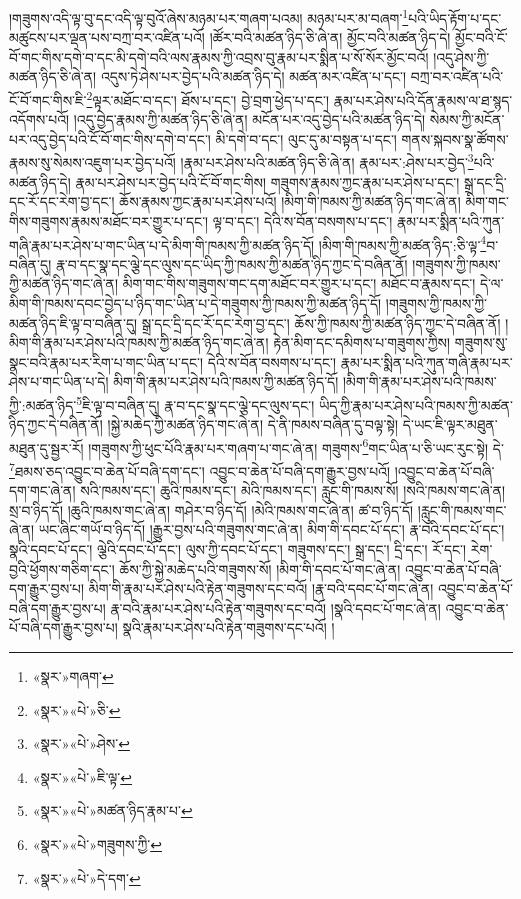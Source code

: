 །གཟུགས་འདི་ལྟ་བུ་དང་འདི་ལྟ་བུའོ་ཞེས་མཉམ་པར་གཞག་པའམ། མཉམ་པར་མ་བཞག་\footnote{«སྣར་»གཞག་}པའི་ཡིད་རྟོག་པ་དང་མཚུངས་པར་ལྡན་པས་བཀྲ་བར་འཛིན་པའོ། །ཚོར་བའི་མཚན་ཉིད་ཅི་ཞེ་ན། མྱོང་བའི་མཚན་ཉིད་དེ། མྱོང་བའི་ངོ་བོ་གང་གིས་དགེ་བ་དང་མི་དགེ་བའི་ལས་རྣམས་ཀྱི་འབྲས་བུ་རྣམ་པར་སྨིན་པ་སོ་སོར་མྱོང་བའོ། །འདུ་ཤེས་ཀྱི་མཚན་ཉིད་ཅི་ཞེ་ན། འདུས་ཏེ་ཤེས་པར་བྱེད་པའི་མཚན་ཉིད་དེ། མཚན་མར་འཛིན་པ་དང་། བཀྲ་བར་འཛིན་པའི་ངོ་བོ་གང་གིས་ཇི་\footnote{«སྣར་»«པེ་»ཅི་}ལྟར་མཐོང་བ་དང་། ཐོས་པ་དང་། བྱེ་བྲག་ཕྱེད་པ་དང་། རྣམ་པར་ཤེས་པའི་དོན་རྣམས་ལ་ཐ་སྙད་འདོགས་པའོ། །འདུ་བྱེད་རྣམས་ཀྱི་མཚན་ཉིད་ཅི་ཞེ་ན། མངོན་པར་འདུ་བྱེད་པའི་མཚན་ཉིད་དེ། སེམས་ཀྱི་མངོན་པར་འདུ་བྱེད་པའི་ངོ་བོ་གང་གིས་དགེ་བ་དང་། མི་དགེ་བ་དང་། ལུང་དུ་མ་བསྟན་པ་དང་། གནས་སྐབས་སྣ་ཚོགས་རྣམས་སུ་སེམས་འཇུག་པར་བྱེད་པའོ། །རྣམ་པར་ཤེས་པའི་མཚན་ཉིད་ཅི་ཞེ་ན། རྣམ་པར་:ཤེས་པར་བྱེད་\footnote{«སྣར་»«པེ་»ཤེས་}པའི་མཚན་ཉིད་དེ། རྣམ་པར་ཤེས་པར་བྱེད་པའི་ངོ་བོ་གང་གིས། གཟུགས་རྣམས་ཀྱང་རྣམ་པར་ཤེས་པ་དང་། སྒྲ་དང་དྲི་དང་རོ་དང་རེག་བྱ་དང་། ཆོས་རྣམས་ཀྱང་རྣམ་པར་ཤེས་པའོ། །མིག་གི་ཁམས་ཀྱི་མཚན་ཉིད་གང་ཞེ་ན། མིག་གང་གིས་གཟུགས་རྣམས་མཐོང་བར་གྱུར་པ་དང་། ལྟ་བ་དང་། དེའི་ས་བོན་བསགས་པ་དང་། རྣམ་པར་སྨིན་པའི་ཀུན་གཞི་རྣམ་པར་ཤེས་པ་གང་ཡིན་པ་དེ་མིག་གི་ཁམས་ཀྱི་མཚན་ཉིད་དོ། །མིག་གི་ཁམས་ཀྱི་མཚན་ཉིད་:ཅི་ལྟ་\footnote{«སྣར་»«པེ་»ཇི་ལྟ་}བ་བཞིན་དུ། རྣ་བ་དང་སྣ་དང་ལྕེ་དང་ལུས་དང་ཡིད་ཀྱི་ཁམས་ཀྱི་མཚན་ཉིད་ཀྱང་དེ་བཞིན་ནོ། །གཟུགས་ཀྱི་ཁམས་ཀྱི་མཚན་ཉིད་གང་ཞེ་ན། མིག་གང་གིས་གཟུགས་གང་དག་མཐོང་བར་གྱུར་པ་དང་། མཐོང་བ་རྣམས་དང་། དེ་ལ་མིག་གི་ཁམས་དབང་བྱེད་པ་ཉིད་གང་ཡིན་པ་དེ་གཟུགས་ཀྱི་ཁམས་ཀྱི་མཚན་ཉིད་དོ། །གཟུགས་ཀྱི་ཁམས་ཀྱི་མཚན་ཉིད་ཇི་ལྟ་བ་བཞིན་དུ། སྒྲ་དང་དྲི་དང་རོ་དང་རེག་བྱ་དང་། ཆོས་ཀྱི་ཁམས་ཀྱི་མཚན་ཉིད་ཀྱང་དེ་བཞིན་ནོ། །མིག་གི་རྣམ་པར་ཤེས་པའི་ཁམས་ཀྱི་མཚན་ཉིད་གང་ཞེ་ན། རྟེན་མིག་དང་དམིགས་པ་གཟུགས་ཀྱིས། གཟུགས་སུ་སྣང་བའི་རྣམ་པར་རིག་པ་གང་ཡིན་པ་དང་། དེའི་ས་བོན་བསགས་པ་དང་། རྣམ་པར་སྨིན་པའི་ཀུན་གཞི་རྣམ་པར་ཤེས་པ་གང་ཡིན་པ་དེ། མིག་གི་རྣམ་པར་ཤེས་པའི་ཁམས་ཀྱི་མཚན་ཉིད་དོ། །མིག་གི་རྣམ་པར་ཤེས་པའི་ཁམས་ཀྱི་:མཚན་ཉིད་\footnote{«སྣར་»«པེ་»མཚན་ཉིད་རྣམ་པ་}ཇི་ལྟ་བ་བཞིན་དུ། རྣ་བ་དང་སྣ་དང་ལྕེ་དང་ལུས་དང་། ཡིད་ཀྱི་རྣམ་པར་ཤེས་པའི་ཁམས་ཀྱི་མཚན་ཉིད་ཀྱང་དེ་བཞིན་ནོ། །སྐྱེ་མཆེད་ཀྱི་མཚན་ཉིད་གང་ཞེ་ན། དེ་ནི་ཁམས་བཞིན་དུ་བལྟ་སྟེ། དེ་ཡང་ཇི་ལྟར་མཐུན་མཐུན་དུ་སྦྱར་རོ། །གཟུགས་ཀྱི་ཕུང་པོའི་རྣམ་པར་གཞག་པ་གང་ཞེ་ན། གཟུགས་\footnote{«སྣར་»«པེ་»གཟུགས་ཀྱི་}གང་ཡིན་པ་ཅི་ཡང་རུང་སྟེ། དེ་\footnote{«སྣར་»«པེ་»དེ་དག་}ཐམས་ཅད་འབྱུང་བ་ཆེན་པོ་བཞི་དག་དང་། འབྱུང་བ་ཆེན་པོ་བཞི་དག་རྒྱུར་བྱས་པའོ། །འབྱུང་བ་ཆེན་པོ་བཞི་དག་གང་ཞེ་ན། སའི་ཁམས་དང་། ཆུའི་ཁམས་དང་། མེའི་ཁམས་དང་། རླུང་གི་ཁམས་སོ། །སའི་ཁམས་གང་ཞེ་ན། སྲ་བ་ཉིད་དོ། །ཆུའི་ཁམས་གང་ཞེ་ན། གཤེར་བ་ཉིད་དོ། །མེའི་ཁམས་གང་ཞེ་ན། ཚ་བ་ཉིད་དོ། །རླུང་གི་ཁམས་གང་ཞེ་ན། ཡང་ཞིང་གཡོ་བ་ཉིད་དོ། །རྒྱུར་བྱས་པའི་གཟུགས་གང་ཞེ་ན། མིག་གི་དབང་པོ་དང་། རྣ་བའི་དབང་པོ་དང་། སྣའི་དབང་པོ་དང་། ལྕེའི་དབང་པོ་དང་། ལུས་ཀྱི་དབང་པོ་དང་། གཟུགས་དང་། སྒྲ་དང་། དྲི་དང་། རོ་དང་། རེག་བྱའི་ཕྱོགས་གཅིག་དང་། ཆོས་ཀྱི་སྐྱེ་མཆེད་པའི་གཟུགས་སོ། །མིག་གི་དབང་པོ་གང་ཞེ་ན། འབྱུང་བ་ཆེན་པོ་བཞི་དག་རྒྱུར་བྱས་པ། མིག་གི་རྣམ་པར་ཤེས་པའི་རྟེན་གཟུགས་དང་བའོ། །རྣ་བའི་དབང་པོ་གང་ཞེ་ན། འབྱུང་བ་ཆེན་པོ་བཞི་དག་རྒྱུར་བྱས་པ། རྣ་བའི་རྣམ་པར་ཤེས་པའི་རྟེན་གཟུགས་དང་བའོ། །སྣའི་དབང་པོ་གང་ཞེ་ན། འབྱུང་བ་ཆེན་པོ་བཞི་དག་རྒྱུར་བྱས་པ། སྣའི་རྣམ་པར་ཤེས་པའི་རྟེན་གཟུགས་དང་པའོ། །

